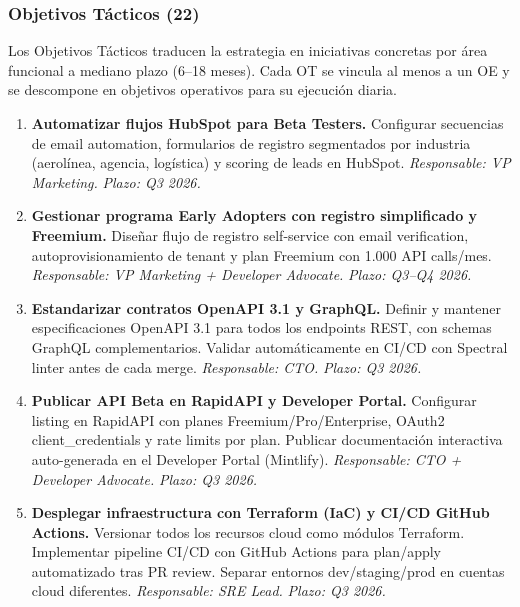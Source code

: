 ﻿\documentclass[11pt, letterpaper]{article}
\begin{document}
\subsubsection{Objetivos Tácticos (22)}



Los Objetivos Tácticos traducen la estrategia en iniciativas concretas por área funcional a mediano plazo (6--18 meses). Cada OT se vincula al menos a un OE y se descompone en objetivos operativos para su ejecución diaria.



\begin{enumerate}[leftmargin=1.5cm, label=\textbf{OT\arabic*}, itemsep=2pt, topsep=4pt]

    \item \textbf{Automatizar flujos HubSpot para Beta Testers.} Configurar secuencias de email automation, formularios de registro segmentados por industria (aerolínea, agencia, logística) y scoring de leads en HubSpot. \textit{Responsable: VP Marketing.} \textit{Plazo: Q3 2026.}



    \item \textbf{Gestionar programa Early Adopters con registro simplificado y Freemium.} Diseñar flujo de registro self-service con email verification, autoprovisionamiento de tenant y plan Freemium con 1.000 API calls/mes. \textit{Responsable: VP Marketing + Developer Advocate.} \textit{Plazo: Q3--Q4 2026.}



    \item \textbf{Estandarizar contratos OpenAPI 3.1 y GraphQL.} Definir y mantener especificaciones OpenAPI 3.1 para todos los endpoints REST, con schemas GraphQL complementarios. Validar automáticamente en CI/CD con Spectral linter antes de cada merge. \textit{Responsable: CTO.} \textit{Plazo: Q3 2026.}



    \item \textbf{Publicar API Beta en RapidAPI y Developer Portal.} Configurar listing en RapidAPI con planes Freemium/Pro/Enterprise, OAuth2 client\_credentials y rate limits por plan. Publicar documentación interactiva auto-generada en el Developer Portal (Mintlify). \textit{Responsable: CTO + Developer Advocate.} \textit{Plazo: Q3 2026.}



    \item \textbf{Desplegar infraestructura con Terraform (IaC) y CI/CD GitHub Actions.} Versionar todos los recursos cloud como módulos Terraform. Implementar pipeline CI/CD con GitHub Actions para plan/apply automatizado tras PR review. Separar entornos dev/staging/prod en cuentas cloud diferentes. \textit{Responsable: SRE Lead.} \textit{Plazo: Q3 2026.}




\end{enumerate}
\end{document}
